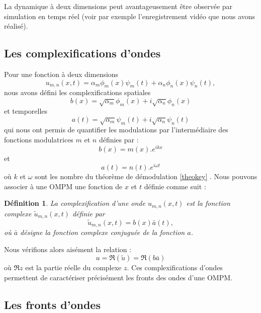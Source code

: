 \documentclass{book}
\newtheorem{defn}{D\'efinition}[chapter]
\begin{document}
La dynamique \`a deux dimensions peut avantageusement \^etre
observ\'ee par 
simulation en temps r\'eel (voir par exemple l'enregistrement vid\'eo
que nous avons r\'ealis\'e).


\subsection{Les complexifications d'ondes}
Pour une fonction \`a deux dimensions
\begin{equation}
u_{m,n}(x,t)=\alpha_m \phi_m(x)\psi_m(t)+\alpha_n \phi_n(x)\psi_n(t),
\end{equation}
nous avons d\'efini les complexifications spatiales
\begin{equation}
b(x)=\sqrt{\alpha_m}\phi_m(x)+i\sqrt{\alpha_n}\phi_n(x)
\end{equation}
et temporelles 
\begin{equation}
a(t)=\sqrt{\alpha_m}\psi_m(t)+i\sqrt{\alpha_n}\psi_n(t)
\end{equation}
qui nous ont permis de quantifier les modulations par l'interm\'ediaire
des fonctions modulatrices  $m$ et $n$ d\'efinies par :
\begin{equation}
b(x)=m(x).e^{i k x}
\end{equation}
et
\begin{equation}
a(t)=n(t).e^{i\omega t}
\end{equation}
o\`u $k$ et $\omega$ sont les nombre du th\'eor\`eme de d\'emodulation
\ref{theokey} . 
Nous pouvons associer \`a une OMPM une fonction de $x$ et $t$ d\'efinie
comme suit :

\begin{defn}
La complexification d'une onde ${u}_{m,n}(x,t)$ est la fonction
complexe $\tilde{u}_{m,n}(x,t)$ d\'efinie par
\begin{equation}
\tilde{u}_{m,n}(x,t)=b(x)\bar a(t),
\end{equation}
o\`u $\bar a$ d\'esigne la fonction complexe conjugu\'ee de la
fonction $a$.
\end{defn}
Nous v\'erifions alors ais\'ement la relation :
\begin{equation}
u=\Re(\tilde u)=\Re(b\bar a)
\end{equation}
o\`u $\Re z$ est la partie r\'eelle du complexe  $z$.
Ces complexifications d'ondes permettent de caract\'eriser
pr\'ecis\'ement les 
fronts des ondes d'une OMPM. 

\subsection{Les fronts d'ondes}\label{sectionfronts}
\end{document}
